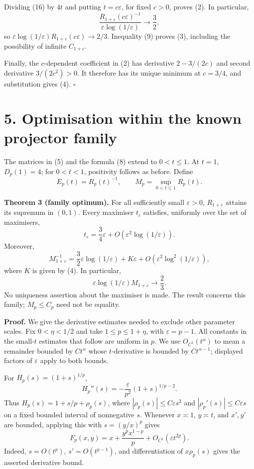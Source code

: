 \documentclass[11pt,a4paper]{article}
\begin{document}
Dividing (16) by \(4t\) and putting \(t=c\varepsilon\), for fixed \(c>0\), proves (2). In particular, \[
\frac{R_{1+\varepsilon}(c\varepsilon)^{-1}}{\varepsilon\log(1/\varepsilon)}\longrightarrow\frac32,
\] so \(\varepsilon\log(1/\varepsilon)R_{1+\varepsilon}(c\varepsilon)\to2/3\). Inequality (9) proves (3), including the possibility of infinite \(C_{1+\varepsilon}\).

Finally, the \(c\)-dependent coefficient in (2) has derivative \(2-3/(2c)\) and second derivative \(3/(2c^2)>0\). It therefore has its unique minimum at \(c=3/4\), and substitution gives (4). \(\square\)

\section*{5. Optimisation within the known projector family}\label{optimisation-within-the-known-projector-family}

The matrices in (5) and the formula (8) extend to \(0<t\le1\). At \(t=1\), \(D_p(1)=4\); for \(0<t<1\), positivity follows as before. Define \[
E_p(t)=R_p(t)^{-1},\qquad M_p=\sup_{0<t\le1}R_p(t).
\]

\textbf{Theorem 3 (family optimum).} For all sufficiently small \(\varepsilon>0\), \(R_{1+\varepsilon}\) attains its supremum in \((0,1)\). Every maximiser \(t_\varepsilon\) satisfies, uniformly over the set of maximisers, \[
t_\varepsilon=\frac34\varepsilon
+O\!\left(\varepsilon^2\log(1/\varepsilon)\right). \tag{17}
\] Moreover, \[
M_{1+\varepsilon}^{-1}
=\frac32\varepsilon\log(1/\varepsilon)+K\varepsilon
+O\!\left(\varepsilon^2\log^2(1/\varepsilon)\right), \tag{18}
\] where \(K\) is given by (4). In particular, \[
\varepsilon\log(1/\varepsilon)M_{1+\varepsilon}\longrightarrow\frac23.
\] No uniqueness assertion about the maximiser is made. The result concerns this family; \(M_p\le C_p\) need not be equality.

\textbf{Proof.} We give the derivative estimates needed to exclude other parameter scales. Fix \(0<\eta<1/2\) and take \(1\le p\le1+\eta\), with \(\varepsilon=p-1\). All constants in the small-\(t\) estimates that follow are uniform in \(p\). We use \(O_{C^1}(t^\alpha)\) to mean a remainder bounded by \(Ct^\alpha\) whose \(t\)-derivative is bounded by \(Ct^{\alpha-1}\); displayed factors of \(\varepsilon\) apply to both bounds.

For \(H_p(s)=(1+s)^{1/p}\), \[
H_p''(s)=-\frac{\varepsilon}{p^2}(1+s)^{1/p-2}.
\] Thus \(H_p(s)=1+s/p+\rho_p(s)\), where \(|\rho_p(s)|\le C\varepsilon s^2\) and \(|\rho_p'(s)|\le C\varepsilon s\) on a fixed bounded interval of nonnegative \(s\). Whenever \(x\asymp1\), \(y\asymp t\), and \(x',y'\) are bounded, applying this with \(s=(y/x)^p\) gives \[
F_p(x,y)=x+\frac{y^p x^{1-p}}p
+O_{C^1}(\varepsilon t^{2p}). \tag{19}
\] Indeed, \(s=O(t^p)\), \(s'=O(t^{p-1})\), and differentiation of \(x\rho_p(s)\) gives the asserted derivative bound.
\end{document}
